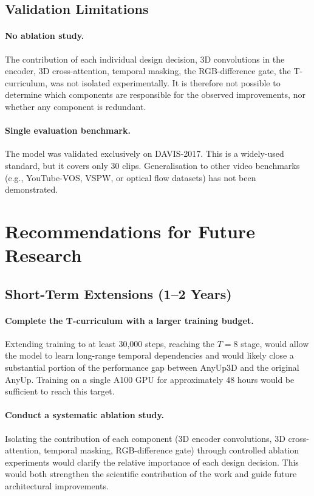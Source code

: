 \subsection{Validation Limitations}


\paragraph{No ablation study.}
The contribution of each individual design decision, 3D convolutions in the encoder, 3D cross-attention, temporal masking, the RGB-difference gate, the T-curriculum, was not isolated experimentally.
It is therefore not possible to determine which components are responsible for the observed improvements, nor whether any component is redundant.

\paragraph{Single evaluation benchmark.}
The model was validated exclusively on DAVIS-2017.
This is a widely-used standard, but it covers only 30 clips.
Generalisation to other video benchmarks (e.g., YouTube-VOS, VSPW, or optical flow datasets) has not been demonstrated.

\section{Recommendations for Future Research}
\label{sec:future}

\subsection{Short-Term Extensions (1--2 Years)}

\paragraph{Complete the T-curriculum with a larger training budget.}
Extending training to at least 30{,}000 steps, reaching the $T\!=\!8$ stage, would allow the model to learn long-range temporal dependencies and would likely close a substantial portion of the performance gap between AnyUp3D and the original AnyUp.
Training on a single A100 GPU for approximately 48 hours would be sufficient to reach this target.

\paragraph{Conduct a systematic ablation study.}
Isolating the contribution of each component (3D encoder convolutions, 3D cross-attention, temporal masking, RGB-difference gate) through controlled ablation experiments would clarify the relative importance of each design decision.
This would both strengthen the scientific contribution of the work and guide future architectural improvements.

